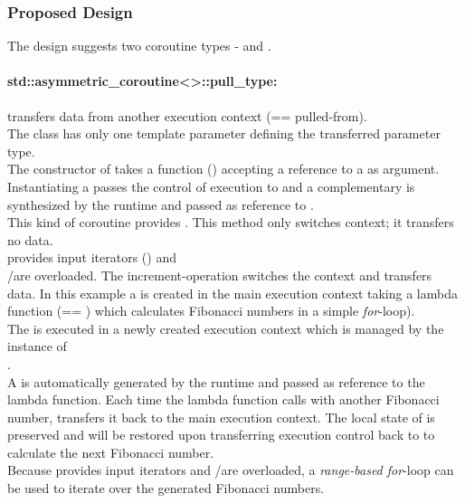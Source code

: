 
\subsubsection*{Proposed Design}
The design suggests two coroutine types - \acoro and \scoro.

\paragraph*{std::asymmetric\_coroutine<>::pull\_type:}
transfers data from another execution context (== pulled-from).\\
The class has only one template parameter defining the transferred parameter
type.\\
The constructor of \pullcoro takes a function (\corofunction) accepting a
reference to a \pushcoro as argument. Instantiating a \pullcoro passes the
control of execution to \corofunction and a complementary \pushcoro is
synthesized by the runtime and passed as reference to \corofunction.\\
\newline
This kind of coroutine provides \pullcoroop. This method only switches
context; it transfers no data.\\
\newline
\pullcoro provides input iterators (\pullcoroiterator) and\\
\bgin/\ed are overloaded. The increment-operation switches the context and
transfers data.
In this example a \pullcoro is created in the main execution context taking a
lambda function (== \corofunction) which calculates Fibonacci numbers in a simple
\textit{for}-loop).\\
The \corofunction is executed in a newly created execution context which is
managed by the instance of\\
\pullcoro.\\
A \pushcoro is automatically generated by the runtime and passed as reference
to the lambda function. Each time the lambda function calls \pushcoroop with
another Fibonacci number, \pushcoro transfers it back to the main execution
context. The local state of \corofunction is preserved and
will be restored upon transferring execution control back to \corofunction
to calculate the next Fibonacci number.\\
Because \pullcoro provides input iterators and \bgin/\ed are overloaded, a
\textit{range-based for}-loop can be used to iterate over the generated
Fibonacci numbers.

